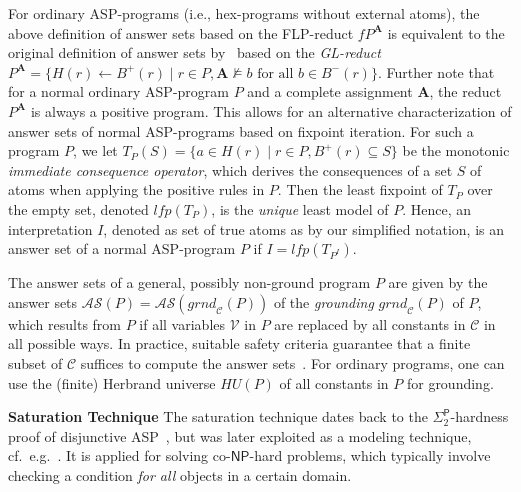 \documentclass[11pt,fleqn,twoside]{article}
\newcommand{\leanparagraph}[1]{\smallskip\noindent\textbf{#1}}
\newcommand\hex{{\sc hex}\xspace}
\newcommand{\p}{\ensuremath{\mathsf{P}}\xspace}
\newcommand{\conp}{co-\ensuremath{\mathsf{NP}}\xspace}
\newcommand{\grnd}{\ensuremath{\mathit{grnd}}}
\newcommand{\Assignment}{\ensuremath{\mathbf{A}}}
\newcommand{\Program}{\ensuremath{P}}
\begin{document}
		For ordinary ASP-programs (i.e., \hex-programs without external atoms), the above definition of answer sets based on the FLP-reduct $f P^{\Assignment}$
		is equivalent to the original definition of answer sets by~
		based on the \emph{GL-reduct} $P^{\Assignment} = \{ H(r) \leftarrow B^{+}(r) \mid r \in P, \Assignment \not\models b \text{ for all } b \in B^{-}(r) \}$.
		Further note that for a normal ordinary ASP-program $P$ and a complete assignment $\Assignment$, the reduct $P^{\Assignment}$ is always a positive program.
		This allows for an alternative characterization of answer sets of normal ASP-programs based on fixpoint iteration.
		For such a program $P$, we let $T_P(S) = \{ a \in H(r) \mid r \in P, B^{+}(r) \subseteq S \}$
		be the monotonic \emph{immediate consequence operator}, which derives the consequences of a set $S$ of atoms when applying the positive rules in $P$.
		Then the least fixpoint of $T_P$ over the empty set, denoted $\mathit{lfp}(T_P)$, is the \emph{unique} least model of $P$.
		Hence, an interpretation $I$, denoted as set of true atoms as by our simplified notation, is an answer set of a normal ASP-program $P$ if $I = \mathit{lfp}(T_{P^I})$.
		
		The answer sets of a general, possibly non-ground program $\Program$ are given by the answer sets
		$\mathcal{AS}(P) = \mathcal{AS}(\grnd_{\mathcal{C}}(P))$ of the \emph{grounding} $\grnd_{\mathcal{C}}(P)$ of $\Program$,
		which results from $\Program$ if all variables $\mathcal{V}$ in $\Program$ are replaced by all constants in $\mathcal{C}$ in all possible ways.
		In practice, suitable safety criteria guarantee that a finite subset of $\mathcal{C}$ suffices to compute the answer sets~\cite{efkr2016-aij}.
		For ordinary programs, one can use the (finite) Herbrand universe $\mathit{HU}(\Program)$ of all constants in $\Program$ for grounding.

		\leanparagraph{Saturation Technique}
		The saturation technique dates back to the $\Sigma^{\p}_2$-hardness proof of disjunctive ASP~\cite{DBLP:journals/amai/EiterG95},
		but was later exploited as a modeling technique, cf.~e.g.~.
		It is applied for solving \conp-hard problems, which typically involve checking a condition \emph{for all} objects in a certain domain.
\end{document}
